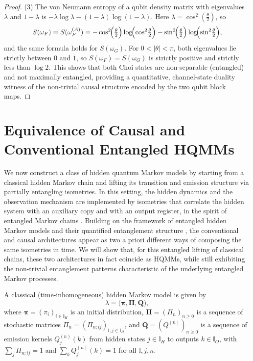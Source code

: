 \documentclass[11pt, reco]{article}
\begin{document}
\begin{proof}
(3) The von Neumann entropy of a qubit density matrix with eigenvalues \(\lambda\) and \(1-\lambda\) is
\(
-\lambda\log\lambda-(1-\lambda)\log(1-\lambda)
\).
Here \(\lambda=\cos^2(\tfrac{\theta}{2})\), so
\[
S(\omega_F)
=
S(\omega_F^{(A)})
=
-\cos^2\!\Bigl(\tfrac{\theta}{2}\Bigr)\log\!\Bigl(\cos^2\!\tfrac{\theta}{2}\Bigr)
-\sin^2\!\Bigl(\tfrac{\theta}{2}\Bigr)\log\!\Bigl(\sin^2\!\tfrac{\theta}{2}\Bigr),
\]
and the same formula holds for \(S(\omega_G)\). For \(0<|\theta|<\pi\), both eigenvalues lie strictly between
\(0\) and \(1\), so \(S(\omega_F)=S(\omega_G)\) is strictly positive and strictly less than \(\log 2\). This shows that both
Choi states are non-separable (entangled) and not maximally entangled, providing a quantitative, channel-state
duality witness of the non-trivial causal structure encoded by the two qubit block maps.
\end{proof}



\section{Equivalence of Causal and Conventional Entangled HQMMs}\label{Sec-EHMM}

We now construct a class of hidden quantum Markov models by starting from a classical hidden Markov chain and lifting its transition and emission structure via partially entangling isometries. In this setting, the hidden dynamics and the observation mechanism are implemented by isometries that correlate the hidden system with an auxiliary copy and with an output register, in the spirit of entangled Markov chains \cite{AccFid05,AccMaOhy06}. Building on the framework of entangled hidden Markov models and their quantified entanglement structure \cite{SS23,ASSR25}, the conventional and causal architectures appear as two a priori different ways of composing the same isometries in time. We will show that, for this entangled lifting of classical chains, these two architectures in fact coincide as HQMMs, while still exhibiting the non-trivial entanglement patterns characteristic of the underlying entangled Markov processes.

A classical (time-inhomogeneous) hidden Markov model is given by
\[
\lambda = \bigl(\boldsymbol{\pi},\mathbf{\Pi},\mathbf{Q}\bigr),
\]
where \(\boldsymbol{\pi}=(\pi_i)_{i\in\mathbb{I}_H}\) is an initial distribution, \(\mathbf{\Pi}=(\Pi_n)_{n\ge 0}\) is a sequence of stochastic matrices \(\Pi_n=(\Pi_{n;ij})_{\mathbb{I}, j\in\mathbb{I}_H}\), and \(\mathbf{Q}=(Q^{(n)})_{n\ge 0}\) is a sequence of emission kernels \(Q^{(n)}_j(k)\) from hidden states \(j\in\mathbb{I}_H\) to outputs \(k\in\mathbb{I}_O\), with \(\sum_j\Pi_{n;ij}=1\) and \(\sum_k Q^{(n)}_j(k)=1\) for all \(\mathbb{I},j,n\).
\end{document}
